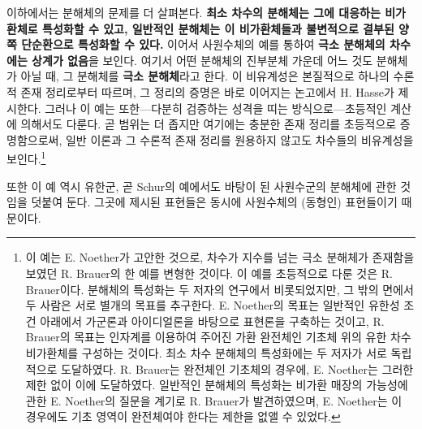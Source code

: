 \documentclass[11pt]{article}
\providecommand{\srcspaced}[1]{\textbf{#1}}
\begin{document}
이하에서는 분해체의 문제를 더 살펴본다. \srcspaced{최소 차수의 분해체는 그에 대응하는 비가환체로 특성화할 수 있고, 일반적인 분해체는 이 비가환체들과 불변적으로 결부된 양쪽 단순환으로 특성화할 수 있다.} 이어서 사원수체의 예를 통하여 \srcspaced{극소 분해체의 차수에는 상계가 없음}을 보인다. 여기서 어떤 분해체의 진부분체 가운데 어느 것도 분해체가 아닐 때, 그 분해체를 \srcspaced{극소 분해체}라고 한다. 이 비유계성은 본질적으로 하나의 수론적 존재 정리로부터 따르며, 그 정리의 증명은 바로 이어지는 논고에서 H. Hasse가 제시한다. 그러나 이 예는 또한---다분히 검증하는 성격을 띠는 방식으로---초등적인 계산에 의해서도 다룬다. 곧 범위는 더 좁지만 여기에는 충분한 존재 정리를 초등적으로 증명함으로써, 일반 이론과 그 수론적 존재 정리를 원용하지 않고도 차수들의 비유계성을 보인다.\footnote{이 예는 E. Noether가 고안한 것으로, 차수가 지수를 넘는 극소 분해체가 존재함을 보였던 R. Brauer의 한 예를 변형한 것이다. 이 예를 초등적으로 다룬 것은 R. Brauer이다. 분해체의 특성화는 두 저자의 연구에서 비롯되었지만, 그 밖의 면에서 두 사람은 서로 별개의 목표를 추구한다. E. Noether의 목표는 일반적인 유한성 조건 아래에서 가군론과 아이디얼론을 바탕으로 표현론을 구축하는 것이고, R. Brauer의 목표는 인자계를 이용하여 주어진 가환 완전체인 기초체 위의 유한 차수 비가환체를 구성하는 것이다. 최소 차수 분해체의 특성화에는 두 저자가 서로 독립적으로 도달하였다. R. Brauer는 완전체인 기초체의 경우에, E. Noether는 그러한 제한 없이 이에 도달하였다. 일반적인 분해체의 특성화는 비가환 매장의 가능성에 관한 E. Noether의 질문을 계기로 R. Brauer가 발견하였으며, E. Noether는 이 경우에도 기초 영역이 완전체여야 한다는 제한을 없앨 수 있었다.}

또한 이 예 역시 유한군, 곧 Schur의 예에서도 바탕이 된 사원수군의 분해체에 관한 것임을 덧붙여 둔다. 그곳에 제시된 표현들은 동시에 사원수체의 (동형인) 표현들이기 때문이다.
\end{document}
